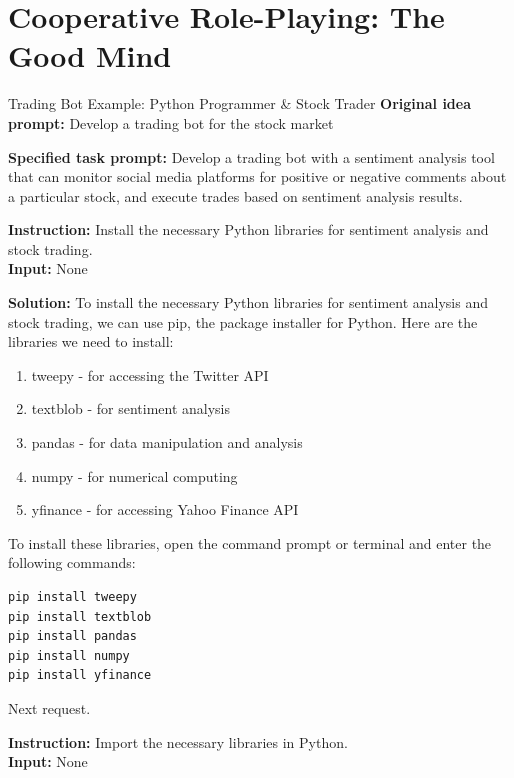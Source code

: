 \appendix

\section{Cooperative Role-Playing: The Good Mind}
\label{stockexample}

\begin{AIBoxBreak}{Trading Bot Example: Python Programmer \& Stock Trader}
	\textbf{Original idea prompt:}
	Develop a trading bot for the stock market

	\textbf{Specified task prompt:}
	Develop a trading bot with a sentiment analysis tool that can monitor social media platforms for positive or negative comments about a particular stock, and execute trades based on sentiment analysis results.


	\usermsg

	\textbf{Instruction:} Install the necessary Python libraries for sentiment analysis and stock trading.\\
	\textbf{Input:} None\\

	\assistantmsg

	\textbf{Solution: }To install the necessary Python libraries for sentiment analysis and stock trading, we can use pip, the package installer for Python. Here are the libraries we need to install:

	\begin{enumerate}
		\item tweepy - for accessing the Twitter API
		\item textblob - for sentiment analysis
		\item pandas - for data manipulation and analysis
		\item numpy - for numerical computing
		\item yfinance - for accessing Yahoo Finance API
	\end{enumerate}
	To install these libraries, open the command prompt or terminal and enter the following commands:


	\begin{lstlisting}[language=Python]
pip install tweepy
pip install textblob
pip install pandas
pip install numpy
pip install yfinance
\end{lstlisting}

	Next request.\\

	\usermsg

	\textbf{Instruction:} Import the necessary libraries in Python.\\
	\textbf{Input:} None\\


\end{AIBoxBreak}

